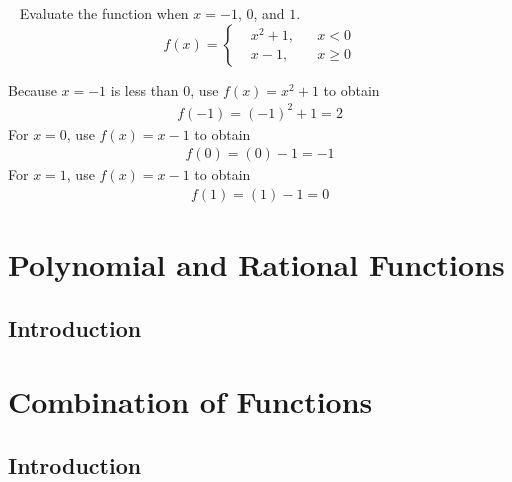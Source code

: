 \documentclass[11pt,fleqn,openany]{book} %
\begin{document}
    \begin{example}~\newline
        Evaluate the function when $x=-1$, $0$, and $1$.
        \begin{equation}
            f(x)=\left\{
                \begin{aligned} 
                    & x^2+1, & & x < 0\\
                    & x-1,   & & x \geq 0
                \end{aligned}\right.
            \end{equation}
        \begin{solution} Because $x=-1$ is less than 0, use $f(x)=x^2+1$ to obtain
            \begin{align}f(-1) = (-1)^2+1 = 2\end{align}
        For $x=0$, use $f(x) = x-1$ to obtain
            \begin{align}f(0) = (0)-1 = -1\end{align}
        For $x=1$, use $f(x) = x-1$ to obtain
            \begin{align}f(1) = (1)-1 = 0\end{align}
        \end{solution}
    \end{example}




\chapter{Polynomial and Rational Functions}
\section{Introduction}
\lipsum[1] 



\chapter{Combination of Functions}
\section{Introduction}
\lipsum[1] 
\end{document}
